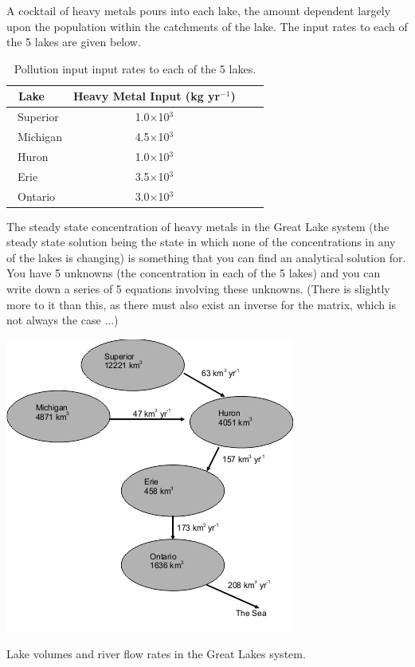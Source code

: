 \documentclass{tufte-book} %
\begin{document}
A cocktail of heavy metals pours into each lake, the amount dependent largely upon the population within the catchments of the lake. The input rates to each of the 5 lakes are given below.

\begin{table}[h]
\footnotesize%
\begin{center}
\begin{tabular}{lccl}
\toprule
\ Lake & Heavy Metal Input (kg yr\(^{-1}\)) \\
\midrule
\ Superior & 1.0\(\times\)10\(^{3}\) \\
\ Michigan & 4.5\(\times\)10\(^{3}\) \\
\ Huron & 1.0\(\times\)10\(^{3}\) \\
\ Erie & 3.5\(\times\)10\(^{3}\) \\
\ Ontario & 3.0\(\times\)10\(^{3}\) \\
\bottomrule
\end{tabular}
\end{center}
\caption{Pollution input input rates to each of the 5 lakes.}
\label{tab:ch4-laketable}
\end{table}

The steady state concentration of heavy metals in the Great Lake system (the steady state solution being the state in which none of the concentrations in any of the lakes is changing) is something that you can find an analytical solution for. You have 5 unknowns (the concentration in each of the 5 lakes) and you can write down a series of 5 equations involving these unknowns. (There is slightly more to it than this, as there must also exist an inverse for the matrix, which is not always the case ...)

\begin{marginfigure}[0.0in]
\includegraphics[width=\linewidth]{ch4-lakes_schematic.tif}
\caption{Lake volumes and river flow rates in the Great Lakes system.}
\label{fig:ch4-lakes_schematic}
\end{marginfigure}
\end{document}
